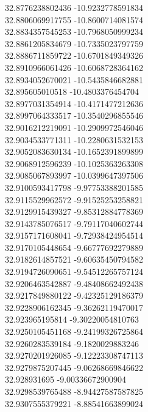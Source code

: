 {32.8776238802436	-10.9232778591834\\
32.8806069917755	-10.8600714081574\\
32.8834357545253	-10.7968050999234\\
32.8861205834679	-10.7335023797759\\
32.8886711859722	-10.6701849349326\\
32.8910966061426	-10.6068728364162\\
32.8934052670021	-10.5435846682881\\
32.895605010518	-10.4803376454704\\
32.8977031354914	-10.4171477212636\\
32.8997064333517	-10.3540296855546\\
32.9016212219091	-10.2909972546046\\
32.9034533771311	-10.2280631532153\\
32.9052083630134	-10.1652391899899\\
32.9068912596239	-10.1025363263308\\
32.9085067893997	-10.0399647397506\\
32.9100593417798	-9.97753388201585\\
32.9115529962572	-9.91525253258821\\
32.9129915439327	-9.85312884778369\\
32.9143785076517	-9.79117040602744\\
32.9157171608041	-9.72938424954514\\
32.9170105448654	-9.66777692279889\\
32.9182614857521	-9.60635450794582\\
32.9194726090651	-9.54512265757124\\
32.9206463542887	-9.48408662492438\\
32.9217849880122	-9.42325129186379\\
32.9228906162345	-9.36262119470017\\
32.923965195814	-9.30220054810763\\
32.9250105451168	-9.24199326725864\\
32.9260283539184	-9.1820029883246\\
32.9270201926085	-9.12223308747113\\
32.9279875207445	-9.06268669846622\\
32.928931695	-9.00336672900904\\
32.9298539765488	-8.94427587587825\\
32.9307555379221	-8.88541663899024\\
}

